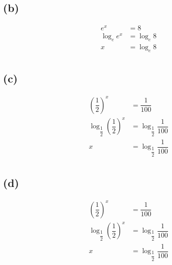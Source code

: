 \documentclass{article}
\begin{document}
\subsection*{(b)}
\begin{equation}
\begin{split}
	e^x & = 8\\
	\log_{e}e^x & = \log_{e}8\\
	 x & = \log_{e}8\\
\end{split}
\end{equation}

\subsection*{(c)}
\begin{equation}
\begin{split}
	(\dfrac{1}{2})^x & = \dfrac{1}{100} \\
	\log_{\dfrac{1}{2}}(\dfrac{1}{2})^x & = \log_{\dfrac{1}{2}}\dfrac{1}{100} \\
	 x & = \log_{\dfrac{1}{2}}\dfrac{1}{100} \\
\end{split}
\end{equation}

\subsection*{(d)}
\begin{equation}
\begin{split}
    (\dfrac{1}{2})^x & = \dfrac{1}{100} \\
    \log_{\dfrac{1}{2}}(\dfrac{1}{2})^x & = \log_{\dfrac{1}{2}}\dfrac{1}{100} \\
     x & = \log_{\dfrac{1}{2}}\dfrac{1}{100} \\
\end{split}
\end{equation}
\end{document}
